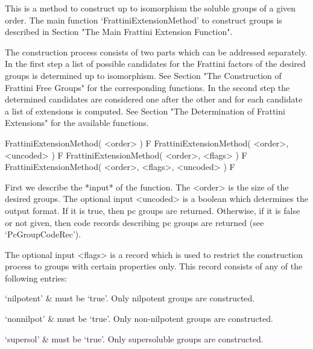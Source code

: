 


This is a method to construct up to isomorphism the soluble groups
of a given order. The main function `FrattiniExtensionMethod' to
construct groups is described in Section "The Main Frattini Extension
Function".

The construction process consists of two parts which can be addressed
separately. In the first step a list of possible candidates for the
Frattini factors of the desired groups is determined up to isomorphism.
See Section "The Construction of Frattini Free Groups" for the
corresponding functions. In the second step the determined candidates
are considered one after the other and for each candidate a list of
extensions is computed. See Section "The Determination of Frattini
Extensions" for the available functions.



\> FrattiniExtensionMethod( <order> ) F
\> FrattiniExtensionMethod( <order>, <uncoded> ) F
\> FrattiniExtensionMethod( <order>, <flags> ) F
\> FrattiniExtensionMethod( <order>, <flags>, <uncoded> ) F

First we describe the *input* of the function. The <order> is the
size of the desired groups. The optional input <uncoded> is a
boolean which determines the output format. If it is true, then
pc groups are returned. Otherwise, if it is false or not given,
then code records describing pc groups are returned (see
`PcGroupCodeRec').

The optional input <flags> is a record which is used to restrict
the construction process to groups with certain properties only.
This record consists of any of the following
entries:

\beginitems
 `nilpotent' &
      must be `true'. Only nilpotent groups are constructed.

 `nonnilpot' &
      must be `true'. Only non-nilpotent groups are constructed.

 `supersol' &
      must be `true'. Only supersoluble groups are constructed.

